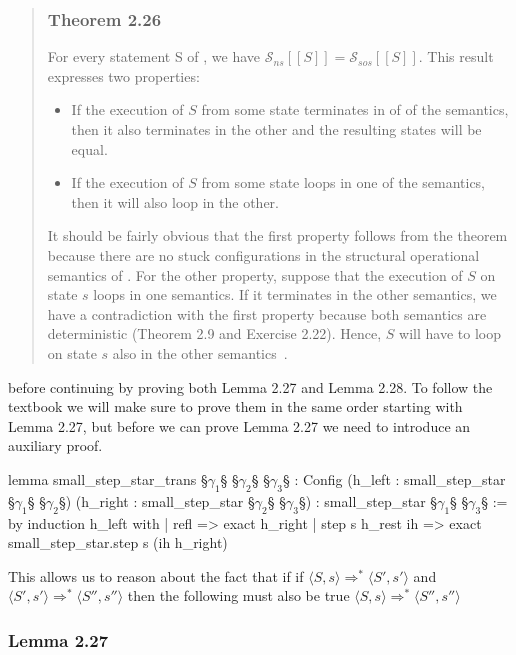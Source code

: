 \begin{quotation}
\subsubsection*{Theorem 2.26}
For every statement S of \While, we have
\(\mathcal{S}_{ns}[\![S]\!] = \mathcal{S}_{sos}[\![S]\!]\).
This result expresses two properties:
\begin{itemize}
    \item If the execution of \(S\) from some state terminates in of of the semantics,
    then it also terminates in the other and the resulting states will be equal.
    \item If the execution of \(S\) from some state loops in one of the semantics,
    then it will also loop in the other.
\end{itemize}
It should be fairly obvious that the first property follows from the theorem because
there are no stuck configurations in the structural operational semantics of \While.
For the other property, suppose that the execution of \(S\) on state \(s\) loops in one semantics.
If it terminates in the other semantics, we have a contradiction with the first property
because both semantics are deterministic (Theorem 2.9 and Exercise 2.22).
Hence, \(S\) will have to loop on state \(s\) also in the other semantics~\citep[p.~41 - 42]{nielson_semantics_2007}.
\end{quotation}
before continuing by proving both Lemma 2.27 and Lemma 2.28.
To follow the textbook we will make sure to prove them in the same order starting with Lemma 2.27,
but before we can prove Lemma 2.27 we need to introduce an auxiliary proof.
\begin{Lean_Code}
lemma small_step_star_trans {§\(\gamma_1\)§ §\(\gamma_2\)§ §\(\gamma_3\)§ : Config}
  (h_left : small_step_star §\(\gamma_1\)§ §\(\gamma_2\)§)
  (h_right : small_step_star §\(\gamma_2\)§ §\(\gamma_3\)§) :
  small_step_star §\(\gamma_1\)§ §\(\gamma_3\)§ := by
  induction h_left with
  | refl => exact h_right
  | step s h_rest ih =>
      exact small_step_star.step s (ih h_right)
\end{Lean_Code}
This allows us to reason about the fact that if if \(\langle S, s \rangle \Rightarrow^* \langle S', s' \rangle\)
and \(\langle S', s' \rangle \Rightarrow^* \langle S'', s'' \rangle\) then the following must also be true \(\langle S, s \rangle \Rightarrow^* \langle S'', s'' \rangle\)

\newpage
\subsubsection*{Lemma 2.27}


